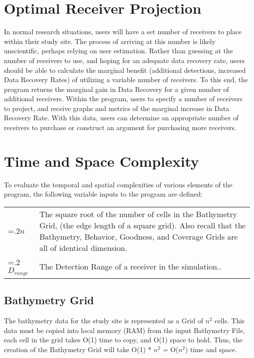 \section{Optimal Receiver Projection}
In normal research situations, users will have a set number of receivers to place within their study site.  The process of arriving at this number is likely unscientific, perhaps relying on user estimation.  Rather than guessing at the number of receivers to use, and hoping for an adequate data recovery rate, users should be able to calculate the marginal benefit (additional detections, increased Data Recovery Rates) of utilizing a variable number of receivers.   To this end, the program returns the marginal gain in Data Recovery for a given number of additional receivers.  Within the program, users to specify a number of receivers to project, and receive graphs and metrics of the marginal increase in Data Recovery Rate.  With this data, users can determine an appropriate number of receivers to purchase or construct an argument for purchasing more receivers.


\section{Time and Space Complexity}
\label{computationalComplexity}
To evaluate the temporal and spatial complexities of various elements of the program, the following variable inputs to the program are defined:\newline

\noindent\begin{tabularx}{\linewidth}{@{}>{\hsize=.2\hsize}X>{\hsize=1.5\hsize}X@{}}
	$n$ & The square root of the number of cells in the Bathymetry Grid, (the edge length of a square grid).  Also recall that the Bathymetry, Behavior, Goodness, and Coverage Grids are all of identical dimension.\newline\\
	 
	 $D_{range}$ & The Detection Range of a receiver in the simulation..\newline\\
\end{tabularx}



\subsection{Bathymetry Grid}
The bathymetry data for the study site is represented as a Grid of $n^2$ cells.  This data must be copied into local memory (RAM) from the input Bathymetry File, each cell in the grid takes O(1) time to copy, and O(1) space to hold.  Thus, the creation of the Bathymetry Grid will take O(1) * $n^2$ = O($n^2$) time and space.

